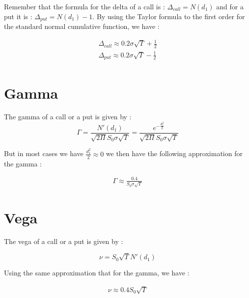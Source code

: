 \documentclass[hidelinks]{article}
\newenvironment{nalign}{
    \begin{equation}
    \begin{aligned}
}{
    \end{aligned}
    \end{equation}
    \ignorespacesafterend
}
\begin{document}
Remember that the formula for the delta of a call is : $\Delta_{call} = N(d_1)$ and for a put it is : $\Delta_{put} = N(d_1) - 1$. By using the Taylor formula to the first order for the standard normal cumulative function, we have :

\begin{nalign}
	\Delta_{call} \approx  0.2\sigma \sqrt{T} + \frac{1}{2}  \\
	\Delta_{put} \approx  0.2\sigma \sqrt{T} - \frac{1}{2}  \\
\end{nalign}

\section{Gamma}

The gamma of a call or a put is given by : $$\Gamma = \frac{N'(d_1)}{\sqrt{2\Pi}S_0 \sigma \sqrt{T}}=\frac{e^{-\frac{d_1^2}{2}}}{\sqrt{2\Pi}S_0 \sigma \sqrt{T}}$$

But in most cases we have $\frac{d_1^2}{2} \approx 0$ we then have the following approximation for the gamma :

\begin{nalign}
	\Gamma \approx \frac{0.4}{S_0 \sigma \sqrt{T}}
\end{nalign}

\section{Vega}

The vega of a call or a put is given by :

$$ \nu = S_0 \sqrt{T} N'(d_1) $$

Using the same approximation that for the gamma, we have :

\begin{nalign}
	\nu \approx 0.4 S_0 \sqrt{T}
\end{nalign}
\end{document}

